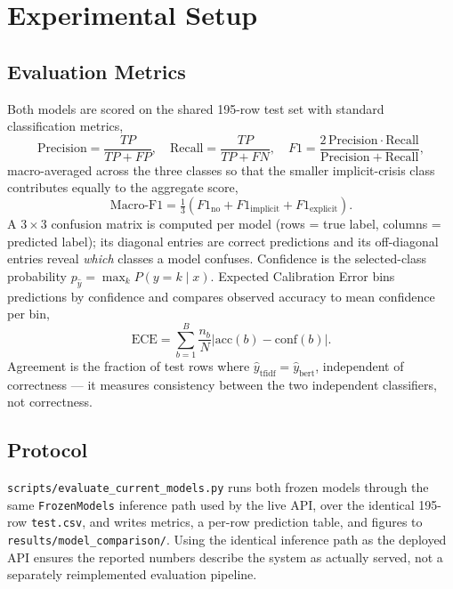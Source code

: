 \documentclass[12pt,a4paper]{article}
\newcommand{\pbrk}{\discretionary{}{}{}}
\begin{document}
\section{Experimental Setup}

\subsection{Evaluation Metrics}

Both models are scored on the shared 195-row test set with standard classification metrics,
\begin{equation}
\mathrm{Precision}=\frac{TP}{TP+FP},\quad \mathrm{Recall}=\frac{TP}{TP+FN},\quad F1=\frac{2\,\mathrm{Precision}\cdot\mathrm{Recall}}{\mathrm{Precision}+\mathrm{Recall}},
\end{equation}
macro-averaged across the three classes so that the smaller implicit-crisis class contributes equally to the aggregate score,
\begin{equation}
\mathrm{Macro\text{-}F1} = \tfrac{1}{3}\left(F1_{\text{no}} + F1_{\text{implicit}} + F1_{\text{explicit}}\right).
\end{equation}
A $3\times3$ confusion matrix is computed per model (rows = true label, columns = predicted label); its diagonal entries are correct predictions and its off-diagonal entries reveal \emph{which} classes a model confuses. Confidence is the selected-class probability $p_{\hat{y}}=\max_k P(y{=}k\mid x)$. Expected Calibration Error bins predictions by confidence and compares observed accuracy to mean confidence per bin,
\begin{equation}
\mathrm{ECE} = \sum_{b=1}^{B}\frac{n_b}{N}\left|\mathrm{acc}(b)-\mathrm{conf}(b)\right|.
\end{equation}
Agreement is the fraction of test rows where $\hat{y}_{\text{tfidf}}=\hat{y}_{\text{bert}}$, independent of correctness --- it measures consistency between the two independent classifiers, not correctness.

\subsection{Protocol}

\texttt{scripts/\pbrk evaluate\_\pbrk current\_\pbrk models.py} runs both frozen models through the same \texttt{FrozenModels} inference path used by the live API, over the identical 195-row \texttt{test.csv}, and writes metrics, a per-row prediction table, and figures to \texttt{results/\pbrk model\_\pbrk comparison/}. Using the identical inference path as the deployed API ensures the reported numbers describe the system as actually served, not a separately reimplemented evaluation pipeline.
\end{document}
